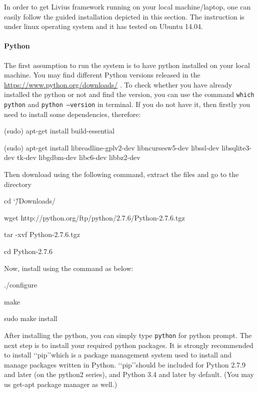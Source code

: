 \documentclass[[12pt,DIV14,BCOR12mm,a4paper,footexclude,headinclude,halfparskip-,twoside,openright,cleardoubleempty,idxtotoc,bibtotoc]{article}
\begin{document}
In order to get Livius framework running  on your local machine/laptop, one can easily follow the guided installation depicted in this section. The instruction is under linux operating system and it has tested on Ubuntu 14.04.

\paragraph{Python}

The first assumption to run the system is to have python installed on your local machine. You may find different Python versions   released in the \url{https://www.python.org/downloads/} \cite{python}. To check whether you have already installed the python or not and find the version, you can use the command \texttt{which python} and \texttt{python --version} in terminal. If you do not have it, then firstly you need to install some dependencies, therefore:

\begin{framed}
 
(sudo) apt-get install build-essential

(sudo) apt-get install libreadline-gplv2-dev libncursesw5-dev libssl-dev libsqlite3-dev tk-dev libgdbm-dev libc6-dev libbz2-dev

\end{framed}


Then download using the following command, extract the files and go to the directory

\begin{framed}

cd \char`\~/Downloads/

wget http://python.org/ftp/python/2.7.6/Python-2.7.6.tgz

tar -xvf Python-2.7.6.tgz

cd Python-2.7.6

\end{framed}

Now, install using the command as below:

\begin{framed}

./configure

make

sudo make install

\end{framed}


After installing the python, you can simply type \texttt{python} for python prompt. The next step is to install your required python packages. It is strongly recommended to install \lq\lq pip\rq\rq which is a package management system used to install and manage packages written in Python. \lq\lq pip\rq\rq should be included for Python 2.7.9 and later (on the python2 series), and Python 3.4 and later by default. (You may us get-apt package manager as well.)
\end{document}
